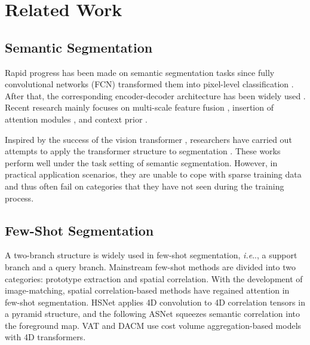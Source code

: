 \documentclass[letterpaper]{article} %
\makeatletter
\DeclareRobustCommand\onedot{\futurelet\@let@token\@onedot}
\def\@onedot{\ifx\@let@token.\else.\null\fi\xspace}
\def\ie{\emph{i.e}\onedot} \def\Ie{\emph{I.e}\onedot}
\makeatother
\begin{document}

\section{Related Work}
\subsection{Semantic Segmentation}
Rapid progress has been made on semantic segmentation tasks since fully convolutional networks (FCN) transformed them into pixel-level classification \cite{long2015fully}. After that, the corresponding encoder-decoder architecture has been widely used \cite{qin2022activation,qin2022multi,qin2023freeseg}. Recent research mainly focuses on multi-scale feature fusion \cite{zhao2017pyramid,chen2018encoder,yang2018denseaspp,he2019adaptive}, insertion of attention modules \cite{fu2019dual,yuan2018ocnet,li2019expectation,tao2020hierarchical,zhu2019asymmetric,zhang2019acfnet}, and context prior \cite{lin2017refinenet,zhang2018context,yu2020context,jin2021mining}.

Inspired by the success of the vision transformer \cite{dosovitskiy2020image}, researchers have carried out attempts to apply the transformer structure to segmentation \cite{yuan2021hrformer,wang2021pyramid,lee2022mpvit,xie2021segformer,strudel2021segmenter}. These works perform well under the task setting of semantic segmentation. However, in practical application scenarios, they are unable to cope with sparse training data and thus often fail on categories that they have not seen during the training process.

\subsection{Few-Shot Segmentation}
A two-branch structure is widely used in few-shot segmentation, \ie, a support branch and a query branch. Mainstream few-shot methods are divided into two categories: prototype extraction and spatial correlation. With the development of image-matching, spatial correlation-based methods have regained attention in few-shot segmentation. HSNet \cite{min2021hypercorrelation} applies 4D convolution to 4D correlation tensors in a pyramid structure, and the following ASNet \cite{kang2022integrative} squeezes semantic correlation into the foreground map. VAT \cite{hong2022cost} and DACM \cite{xiong2022doubly} use cost volume aggregation-based models with 4D transformers.
\end{document}
